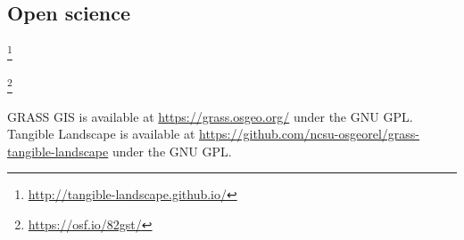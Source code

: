 \documentclass[prodmode,acmtochi]{acmsmall} %
\newcommand{\urlhttp}[1]{\href{http://#1}{\nolinkurl{#1}}}
\newcommand{\urlhttps}[1]{\href{https://#1}{\nolinkurl{#1}}}
\begin{document}
\subsection{Open science}




%



\footnote{\url{http://tangible-landscape.github.io/}}

\footnote{\url{https://osf.io/82gst/}}

GRASS GIS is available at
\url{https://grass.osgeo.org/} 
under the GNU GPL. 
%
Tangible Landscape is available at
\url{https://github.com/ncsu-osgeorel/grass-tangible-landscape} 
under the GNU GPL.  %
\end{document}
